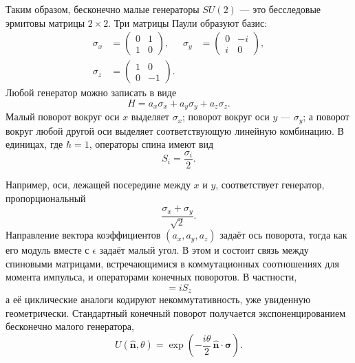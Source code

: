 Таким образом, бесконечно малые генераторы \(SU(2)\) — это бесследовые эрмитовы матрицы \(2\times2\). Три матрицы Паули образуют базис:
\begin{equation}
\begin{aligned}
\sigma_x&=
\begin{pmatrix}0&1\\1&0\end{pmatrix},
&
\sigma_y&=
\begin{pmatrix}0&-i\\i&0\end{pmatrix},
\\[0.4em]
\sigma_z&=
\begin{pmatrix}1&0\\0&-1\end{pmatrix}.
\end{aligned}
\end{equation}
Любой генератор можно записать в виде
\begin{equation}
H=a_x\sigma_x+a_y\sigma_y+a_z\sigma_z.
\end{equation}
Малый поворот вокруг оси \(x\) выделяет \(\sigma_x\); поворот вокруг оси \(y\) — \(\sigma_y\); а поворот вокруг любой другой оси выделяет соответствующую линейную комбинацию. В единицах, где \(\hbar=1\), операторы спина имеют вид
\begin{equation}
S_i=\frac{\sigma_i}{2}.
\end{equation}

Например, оси, лежащей посередине между \(x\) и \(y\), соответствует генератор, пропорциональный
\begin{equation}
\frac{\sigma_x+\sigma_y}{\sqrt2}.
\end{equation}
Направление вектора коэффициентов \((a_x,a_y,a_z)\) задаёт ось поворота, тогда как его модуль вместе с \(\epsilon\) задаёт малый угол. В этом и состоит связь между спиновыми матрицами, встречающимися в коммутационных соотношениях для момента импульса, и операторами конечных поворотов. В частности,
\begin{equation}
[S_x,S_y]=iS_z
\end{equation}
а её циклические аналоги кодируют некоммутативность, уже увиденную геометрически. Стандартный конечный поворот получается экспоненцированием бесконечно малого генератора,
\begin{equation}
U(\hat{\boldsymbol n},\theta)
=\exp\left(-\frac{i\theta}{2}\,
\hat{\boldsymbol n}\cdot\boldsymbol\sigma\right).
\end{equation}
